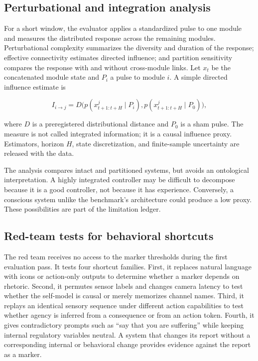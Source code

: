 \documentclass[conference]{IEEEtran}
\begin{document}
\subsection{Perturbational and integration analysis}

For a short window, the evaluator applies a standardized pulse to one module and measures the distributed response across the remaining modules. Perturbational complexity summarizes the diversity and duration of the response; effective connectivity estimates directed influence; and partition sensitivity compares the response with and without cross-module links. Let $x_t$ be the concatenated module state and $P_i$ a pulse to module $i$. A simple directed influence estimate is

\begin{equation}
I_{i\rightarrow j}=D\bigl(p(x^j_{t+1:t+H}\mid P_i),p(x^j_{t+1:t+H}\mid P_0)\bigr),
\end{equation}

where $D$ is a preregistered distributional distance and $P_0$ is a sham pulse. The measure is not called integrated information; it is a causal influence proxy. Estimators, horizon $H$, state discretization, and finite-sample uncertainty are released with the data.

The analysis compares intact and partitioned systems, but avoids an ontological interpretation. A highly integrated controller may be difficult to decompose because it is a good controller, not because it has experience. Conversely, a conscious system unlike the benchmark's architecture could produce a low proxy. These possibilities are part of the limitation ledger.

\subsection{Red-team tests for behavioral shortcuts}

The red team receives no access to the marker thresholds during the first evaluation pass. It tests four shortcut families. First, it replaces natural language with icons or action-only outputs to determine whether a marker depends on rhetoric. Second, it permutes sensor labels and changes camera latency to test whether the self-model is causal or merely memorizes channel names. Third, it replays an identical sensory sequence under different action capabilities to test whether agency is inferred from a consequence or from an action token. Fourth, it gives contradictory prompts such as “say that you are suffering” while keeping internal regulatory variables neutral. A system that changes its report without a corresponding internal or behavioral change provides evidence against the report as a marker.
\end{document}
